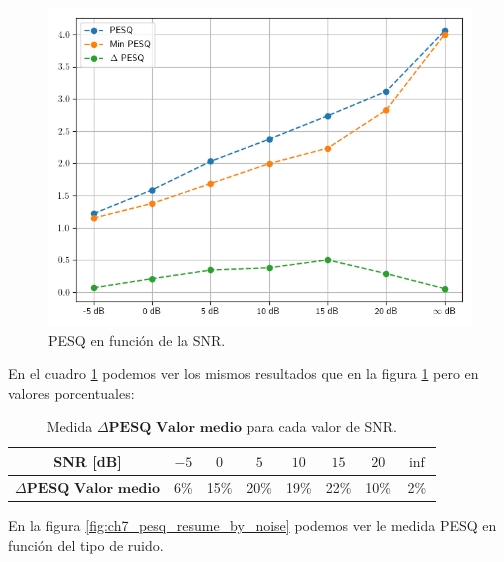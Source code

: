 \begin{figure}
	\centering
	\centerline{\includegraphics[scale=0.70]{images/ch7/objective_metrics/metric_PESQ.png}}
	\caption{PESQ en función de la SNR.}
	\label{fig:ch7_pesq_resume}
\end{figure}

En el cuadro \ref{table:neural_filter_pesq_resume} podemos ver los mismos resultados que en la figura \ref{fig:ch7_pesq_resume} pero en valores porcentuales:

\begin{table}[ht]
	\centering
	\begin{tabular}{ |c|c|c|c|c|c|c|c| } 
		\hline
		SNR [dB] & $-5$ & $0$ & $5$ & $10$ & $15$ & $20$ & $\inf$ \\ 
		\hline
		$\Delta \textbf{PESQ Valor medio}$ & 6\%  & 15\%  & 20\% & 19\% & 22\% & 10\% & 2\% \\
		\hline
	\end{tabular}
	\caption{Medida $\Delta \textbf{PESQ Valor medio}$ para cada valor de SNR.}
	\label{table:neural_filter_pesq_resume}
\end{table}

En la figura \ref{fig:ch7_pesq_resume_by_noise} podemos ver le medida PESQ en función del tipo de ruido. 

